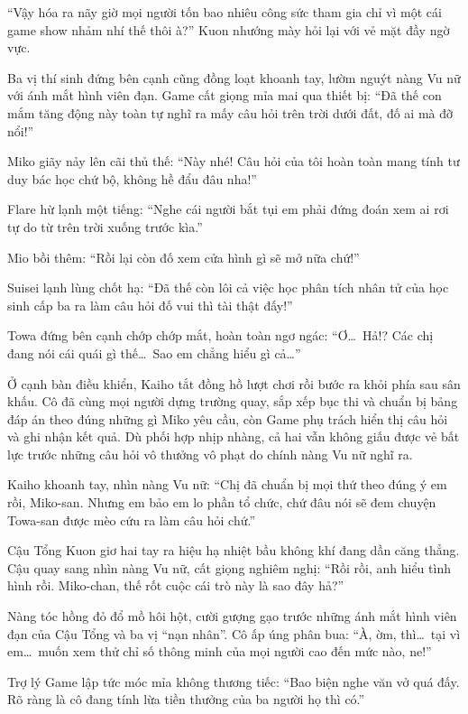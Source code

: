 \documentclass[../main.tex]{subfiles}
\begin{document}
``Vậy hóa ra nãy giờ mọi người tốn bao nhiêu công sức tham gia chỉ vì một cái game show nhảm nhí thế thôi à?'' Kuon nhướng mày hỏi lại với vẻ mặt đầy ngờ vực.

Ba vị thí sinh đứng bên cạnh cũng đồng loạt khoanh tay, lườm nguýt nàng Vu nữ với ánh mắt hình viên đạn. Game cất giọng mỉa mai qua thiết bị: ``Đã thế con mắm tăng động này toàn tự nghĩ ra mấy câu hỏi trên trời dưới đất, đố ai mà đỡ nổi!''

Miko giãy nảy lên cãi thủ thế: ``Này nhé! Câu hỏi của tôi hoàn toàn mang tính tư duy bác học chứ bộ, không hề đẩu đâu nha!''

Flare hừ lạnh một tiếng: ``Nghe cái người bắt tụi em phải đứng đoán xem ai rơi tự do từ trên trời xuống trước kìa.''

Mio bồi thêm: ``Rồi lại còn đố xem cửa hình gì sẽ mở nữa chứ!''

Suisei lạnh lùng chốt hạ: ``Đã thế còn lôi cả việc học phân tích nhân tử của học sinh cấp ba ra làm câu hỏi đố vui thì tài thật đấy!''

Towa đứng bên cạnh chớp chớp mắt, hoàn toàn ngơ ngác: ``Ơ\dots\ Hả!? Các chị đang nói cái quái gì thế\dots\ Sao em chẳng hiểu gì cả\dots''

Ở cạnh bàn điều khiển, Kaiho tắt đồng hồ lượt chơi rồi bước ra khỏi phía sau sân khấu. Cô đã cùng mọi người dựng trường quay, sắp xếp bục thi và chuẩn bị bảng đáp án theo đúng những gì Miko yêu cầu, còn Game phụ trách hiển thị câu hỏi và ghi nhận kết quả. Dù phối hợp nhịp nhàng, cả hai vẫn không giấu được vẻ bất lực trước những câu hỏi vô thưởng vô phạt do chính nàng Vu nữ nghĩ ra.

Kaiho khoanh tay, nhìn nàng Vu nữ: ``Chị đã chuẩn bị mọi thứ theo đúng ý em rồi, Miko-san. Nhưng em bảo em lo phần tổ chức, chứ đâu nói sẽ đem chuyện Towa-san được mèo cứu ra làm câu hỏi chứ.''

Cậu Tổng Kuon giơ hai tay ra hiệu hạ nhiệt bầu không khí đang dần căng thẳng. Cậu quay sang nhìn nàng Vu nữ, cất giọng nghiêm nghị: ``Rồi rồi, anh hiểu tình hình rồi. Miko-chan, thế rốt cuộc cái trò này là sao đây hả?''

Nàng tóc hồng đỏ đổ mồ hôi hột, cười gượng gạo trước những ánh mắt hình viên đạn của Cậu Tổng và ba vị ``nạn nhân''. Cô ấp úng phân bua: ``À, ờm, thì\dots\ tại vì em\dots\ muốn xem thử chỉ số thông minh của mọi người cao đến mức nào, ne!''

Trợ lý Game lập tức móc mỉa không thương tiếc: ``Bao biện nghe văn vở quá đấy. Rõ ràng là cô đang tính lừa tiền thưởng của ba người họ thì có.''
\end{document}
